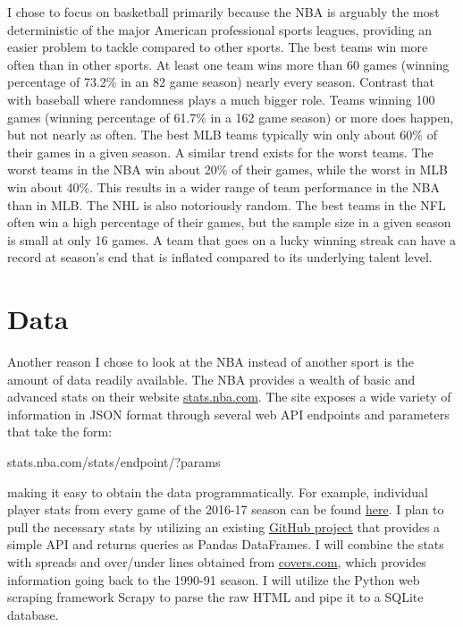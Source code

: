 \documentclass{article}
\begin{document}
I chose to focus on basketball primarily because the NBA is arguably the most deterministic of the major American professional sports leagues, providing an easier problem to tackle compared to other sports. The best teams win more often than in other sports. At least one team wins more than 60 games (winning percentage of 73.2\% in an 82 game season) nearly every season. Contrast that with baseball where randomness plays a much bigger role. Teams winning 100 games (winning percentage of 61.7\% in a 162 game season) or more does happen, but not nearly as often. The best MLB teams typically win only about 60\% of their games in a given season. A similar trend exists for the worst teams. The worst teams in the NBA win about 20\% of their games, while the worst in MLB win about 40\%. This results in a wider range of team performance in the NBA than in MLB. The NHL is also notoriously random. The best teams in the NFL often win a high percentage of their games, but the sample size in a given season is small at only 16 games. A team that goes on a lucky winning streak can have a record at season's end that is inflated compared to its underlying talent level.

\section{Data}

Another reason I chose to look at the NBA instead of another sport is the amount of data readily available. The NBA provides a wealth of basic and advanced stats on their website \url{stats.nba.com}. The site exposes a wide variety of information in JSON format through several web API endpoints and parameters that take the form:

\begin{center}
stats.nba.com/stats/{endpoint}/?{params}
\end{center}

making it easy to obtain the data programmatically. For example, individual player stats from every game of the 2016-17 season can be found \href{http://stats.nba.com/stats/leaguegamelog/?LeagueID=00&Season=2016-17&SeasonType=Regular\%20Season&PlayerOrTeam=P&Sorter=PTS&Direction=DESC}{here}. I plan to pull the necessary stats by utilizing an existing \href{https://github.com/seemethere/nba_py}{GitHub project} that provides a simple API and returns queries as Pandas DataFrames. I will combine the stats with spreads and over/under lines obtained from \url{covers.com}, which provides information going back to the 1990-91 season. I will utilize the Python web scraping framework Scrapy to parse the raw HTML and pipe it to a SQLite database.
\end{document}
